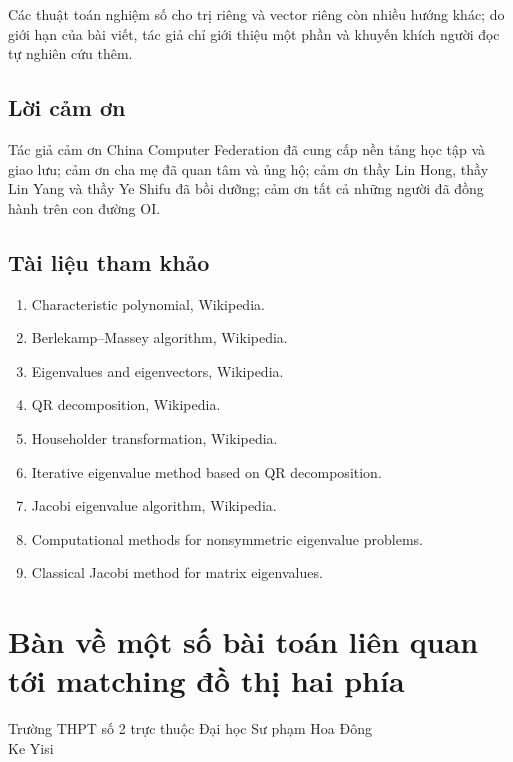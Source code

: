 \documentclass[11pt]{article}
\begin{document}
Các thuật toán nghiệm số cho trị riêng và vector riêng còn nhiều hướng khác;
do giới hạn của bài viết, tác giả chỉ giới thiệu một phần và khuyến khích người
đọc tự nghiên cứu thêm.

\subsection{Lời cảm ơn}

Tác giả cảm ơn China Computer Federation đã cung cấp nền tảng học tập và giao
lưu; cảm ơn cha mẹ đã quan tâm và ủng hộ; cảm ơn thầy Lin Hong, thầy Lin Yang
và thầy Ye Shifu đã bồi dưỡng; cảm ơn tất cả những người đã đồng hành trên con
đường OI.

\subsection{Tài liệu tham khảo}

\begin{enumerate}
  \item Characteristic polynomial, Wikipedia.
  \item Berlekamp--Massey algorithm, Wikipedia.
  \item Eigenvalues and eigenvectors, Wikipedia.
  \item QR decomposition, Wikipedia.
  \item Householder transformation, Wikipedia.
  \item Iterative eigenvalue method based on QR decomposition.
  \item Jacobi eigenvalue algorithm, Wikipedia.
  \item Computational methods for nonsymmetric eigenvalue problems.
  \item Classical Jacobi method for matrix eigenvalues.
\end{enumerate}

\section{Bàn về một số bài toán liên quan tới matching đồ thị hai phía}

\begin{center}
Trường THPT số 2 trực thuộc Đại học Sư phạm Hoa Đông\\
Ke Yisi
\end{center}

\renewcommand{\abstractname}{Tóm tắt}
\begin{abstract}
Matching trên đồ thị hai phía là một lớp bài toán thường gặp trong thi tin học.
Bài viết trước hết tổng kết một số dạng matching hai phía đặc biệt, sau đó
nghiên cứu các bài toán tối ưu trên tập có thể ghép được.
\end{abstract}
\end{document}
